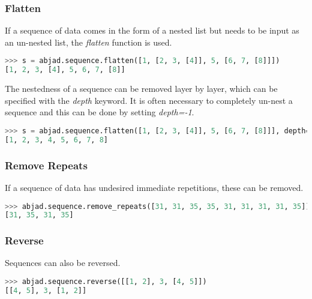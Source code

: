 \subsubsection{Flatten}

If a sequence of data comes in the form of a nested list but needs to be input as an un-nested list, the \textit{flatten} function is used.

\begin{lstlisting}[language=Python,frame=tb,caption={A flattened sequence},label=lst:flatten]
>>> s = abjad.sequence.flatten([1, [2, 3, [4]], 5, [6, 7, [8]]])
[1, 2, 3, [4], 5, 6, 7, [8]]
\end{lstlisting}

The nestedness of a sequence can be removed layer by layer, which can be specified with the \textit{depth} keyword. It is often necessary to completely un-nest a sequence and this can be done by setting \textit{depth=-1}.

\begin{lstlisting}[language=Python,frame=tb,caption={A flattened sequence at depth=-1},label=lst:fully-flatten]
>>> s = abjad.sequence.flatten([1, [2, 3, [4]], 5, [6, 7, [8]]], depth=-1)
[1, 2, 3, 4, 5, 6, 7, 8]
\end{lstlisting}

\subsubsection{Remove Repeats}

If a sequence of data has undesired immediate repetitions, these can be removed.

\begin{lstlisting}[language=Python,frame=tb,caption={A sequence with removed repetitions},label=lst:repeat-removal]
>>> abjad.sequence.remove_repeats([31, 31, 35, 35, 31, 31, 31, 31, 35])
[31, 35, 31, 35]
\end{lstlisting}

\subsubsection{Reverse}

Sequences can also be reversed.

\begin{lstlisting}[language=Python,frame=tb,caption={A reversed sequence},label=lst:reverse]
>>> abjad.sequence.reverse([[1, 2], 3, [4, 5]])
[[4, 5], 3, [1, 2]]
\end{lstlisting}

